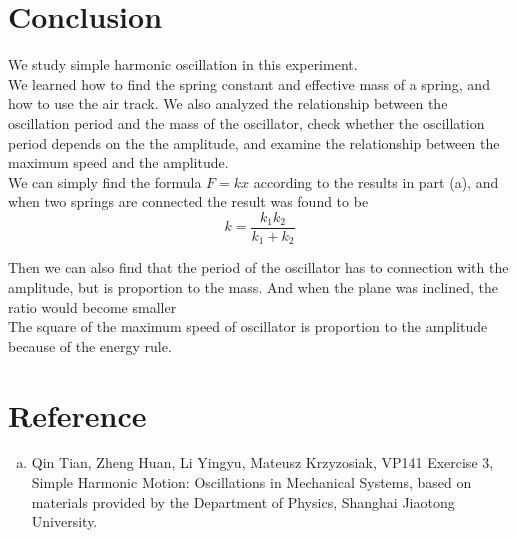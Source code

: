 \documentclass{article}
\begin{document}
\newpage

\section{Conclusion}

We study simple harmonic oscillation in this experiment.\\

We learned how to find the spring constant and effective mass of a spring, and how to use the
air track. We also analyzed the relationship between the oscillation period and the mass
of the oscillator, check whether the oscillation period depends on the the amplitude, and
examine the relationship between the maximum speed and the amplitude.\\

We can simply find the formula $F=kx$ according to the results in part (a), and when two springs are connected the result was found to be 
$$k=\frac{k_1k_2}{k_1+k_2}$$

Then we can also find that the period of the oscillator has to connection with the amplitude, but is proportion to the mass. And when the plane was inclined, the ratio would become smaller\\

The square of the maximum speed of oscillator is proportion to the amplitude because of the energy rule.\\

\section{Reference}

\begin{enumerate}[(a)]
	\item
	Qin Tian, Zheng Huan, Li Yingyu, Mateusz Krzyzosiak, VP141 Exercise 3, Simple Harmonic Motion: Oscillations in Mechanical Systems, based on materials provided by the Department of Physics, Shanghai Jiaotong University.
\end{enumerate}
\end{document}
